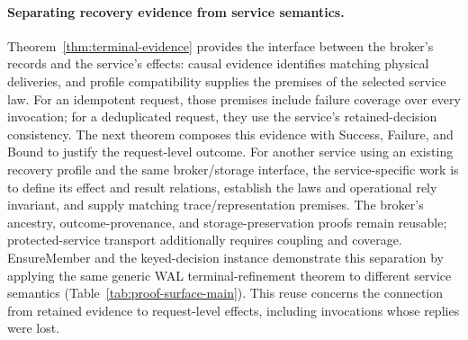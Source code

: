 \documentclass[acmsmall,screen,review,anonymous]{acmart}
\begin{document}
\paragraph{Separating recovery evidence from service semantics.}
Theorem~\ref{thm:terminal-evidence} provides the interface between the
broker's records and the service's effects: causal evidence identifies
matching physical deliveries, and profile compatibility supplies the
premises of the selected service law. For an idempotent request, those
premises include failure coverage over every invocation; for a
deduplicated request, they use the service's retained-decision consistency.
The next theorem composes this evidence with Success, Failure, and Bound
to justify the request-level outcome.
For another service using an existing recovery profile and the same
broker/storage interface, the service-specific work is to define its
effect and result relations, establish the laws and operational rely
invariant, and supply matching trace/representation premises. The broker's
ancestry, outcome-provenance, and storage-preservation proofs remain
reusable; protected-service transport additionally requires coupling and
coverage. EnsureMember and the keyed-decision instance demonstrate this
separation by applying the same generic WAL terminal-refinement theorem
to different service semantics (Table~\ref{tab:proof-surface-main}). This
reuse concerns the connection from retained evidence to request-level
effects, including invocations whose replies were lost.
\end{document}
